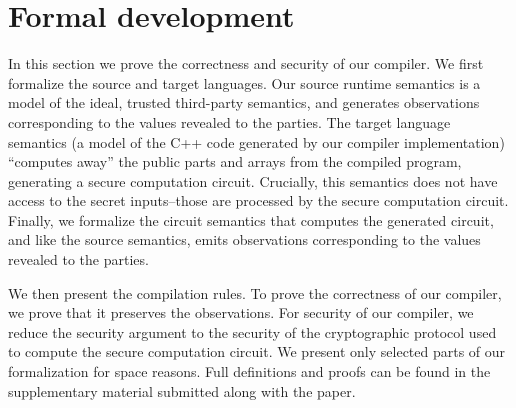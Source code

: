 \newcommand{\kw}[1]{{\lstinline[basicstyle=\small\color{blue}]{#1}}}
\newcommand{\ftext}[1]{\text{\small{#1}}}
\newcommand{\cond}[3]{\ensuremath{{{#1}\:?\:{#2}\::{#3}}}}
\newcommand{\for}[4]{\ensuremath{\kw{for}\:{#1}\:\kw{in}\:[{#2}, {#3}]\:\kw{do}\:{#4}}}
\newcommand{\ite}[3]{\ensuremath{\kw{if}({#1}, {#2}, {#3})}}
\newcommand{\loops}[3]{\ensuremath{\kw{while}\:{#1} \leq {#2}\:\kw{do}\:{#3}}}

\section{Formal development}
\label{sec:ld}


In this section we prove the correctness and security of our compiler.
%
We first formalize the source and target languages. Our source runtime
semantics is a model of the ideal, trusted third-party semantics, and
generates observations corresponding to the values revealed to the
parties.
%
The target language semantics (a model of the C++ code generated by
our compiler implementation) ``computes away'' the public parts and
arrays from the compiled program, generating a secure computation
circuit. Crucially, this semantics does not have access to the secret
inputs--those are processed by the secure computation circuit.
%
Finally, we formalize the circuit semantics that computes the
generated circuit, and like the source semantics, emits observations
corresponding to the values revealed to the parties.

We then present the compilation rules. To prove the correctness
of our compiler, we prove that it preserves the observations. For
security of our compiler, we reduce the security argument to the
security of the cryptographic protocol used to compute the secure
computation circuit.
We present only selected parts of our formalization for space
reasons. Full definitions and proofs can be found in the supplementary
material submitted along with the paper.

